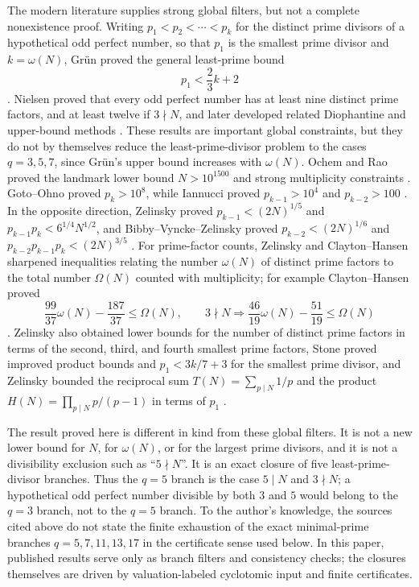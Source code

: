 \documentclass[11pt]{article}
\theoremstyle{definition}
\theoremstyle{remark}
\begin{document}
The modern literature supplies strong global filters, but not a complete
nonexistence proof.  Writing \(p_1<p_2<\cdots<p_k\) for the distinct prime
divisors of a hypothetical odd perfect number, so that \(p_1\) is the smallest
prime divisor and \(k=\omega(N)\), Gr{\"u}n proved the general least-prime
bound
\[
  p_1 < \frac{2}{3}k+2
\]
\cite{Grun1952}.  Nielsen proved that every odd perfect number has at least
nine distinct prime factors, and at least twelve if \(3\nmid N\), and later
developed related Diophantine and upper-bound methods
\cite{Nielsen2007,Nielsen2015}.  These results are important global
constraints, but they do not by themselves reduce the least-prime-divisor
problem to the cases \(q=3,5,7\), since Gr{\"u}n's upper bound increases with
\(\omega(N)\).  Ochem and Rao proved the landmark lower bound \(N>10^{1500}\)
and strong multiplicity constraints \cite{OchemRao2012}.  Goto--Ohno
proved \(p_k>10^8\), while Iannucci proved \(p_{k-1}>10^4\) and
\(p_{k-2}>100\) \cite{GotoOhno2008,Iannucci1999,Iannucci2000}.  In the opposite
direction, Zelinsky proved \(p_{k-1}<(2N)^{1/5}\) and
\(p_{k-1}p_k<6^{1/4}N^{1/2}\), and Bibby--Vyncke--Zelinsky proved
\(p_{k-2}<(2N)^{1/6}\) and \(p_{k-2}p_{k-1}p_k<(2N)^{3/5}\)
\cite{Zelinsky2019,BibbyVynckeZelinsky2021}.  For prime-factor counts, Zelinsky
and Clayton--Hansen sharpened inequalities relating the number \(\omega(N)\) of
distinct prime factors to the total number \(\Omega(N)\) counted with
multiplicity; for example Clayton--Hansen proved
\[
  \frac{99}{37}\omega(N)-\frac{187}{37}\le \Omega(N),
  \qquad
  3\nmid N\Rightarrow
  \frac{46}{19}\omega(N)-\frac{51}{19}\le \Omega(N)
\]
\cite{Zelinsky2021,ClaytonHansen2023}.  Zelinsky also obtained lower bounds for
the number of distinct prime factors in terms of the second, third, and fourth
smallest prime factors, Stone proved improved product bounds and
\(p_1<3k/7+3\) for the smallest prime divisor, and Zelinsky bounded the
reciprocal sum \(T(N)=\sum_{p\mid N}1/p\) and the product
\(H(N)=\prod_{p\mid N}p/(p-1)\) in terms of \(p_1\)
\cite{Zelinsky2023SmallPrimes,Stone2024,Zelinsky2025ReciprocalPrimeDivisors}.

The result proved here is different in kind from these global filters.  It is
not a new lower bound for \(N\), for \(\omega(N)\), or for the largest prime
divisors, and it is not a divisibility exclusion such as ``\(5\nmid N\)''.  It
is an exact closure of five least-prime-divisor branches.  Thus the \(q=5\)
branch is the case \(5\mid N\) and \(3\nmid N\); a hypothetical odd perfect
number divisible by both \(3\) and \(5\) would belong to the \(q=3\) branch, not
to the \(q=5\) branch.  To the author's knowledge, the sources cited above do
not state the finite exhaustion of the exact minimal-prime branches
\(q=5,7,11,13,17\) in the certificate sense used below.  In this paper,
published results serve only as branch filters and consistency checks; the
closures themselves are driven by valuation-labeled cyclotomic input and finite
certificates.
\end{document}
